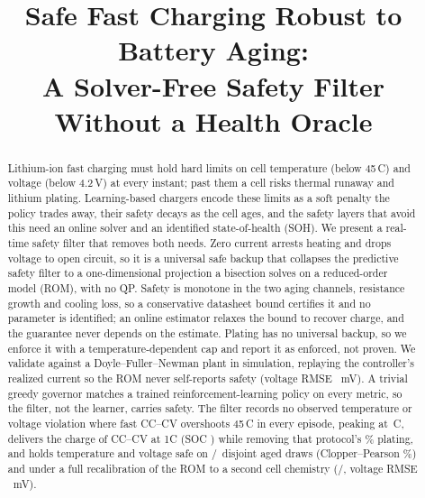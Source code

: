 \documentclass[conference]{IEEEtran}
\newcommand{\SI}[2]{#1\,#2}
\newcommand{\degreeCelsius}{\textdegree C}
\begin{document}
\title{Safe Fast Charging Robust to Battery Aging:\\
A Solver-Free Safety Filter Without a Health Oracle}

\author{
}

\maketitle

\begin{abstract}
Lithium-ion fast charging must hold hard limits on cell temperature (below \SI{45}{\degreeCelsius})
and voltage (below \SI{4.2}{V}) at every instant; past them a cell risks thermal runaway and lithium
plating. Learning-based chargers encode these limits as a soft penalty the policy trades away, their
safety decays as the cell ages, and the safety layers that avoid this need an online solver and an
identified state-of-health (SOH). We present a real-time safety filter that removes both needs. Zero
current arrests heating and drops voltage to open circuit, so it is a universal safe backup that
collapses the predictive safety filter to a one-dimensional projection a bisection solves on a
reduced-order model (ROM), with no QP. Safety is monotone in the two aging channels, resistance growth
and cooling loss, so a conservative datasheet bound certifies it and no parameter is identified; an
online estimator relaxes the bound to recover charge, and the guarantee never depends on the estimate.
Plating has no universal backup, so we enforce it with a temperature-dependent cap and report it as
enforced, not proven. We validate against a Doyle--Fuller--Newman plant in simulation, replaying the
controller's realized current so the ROM never self-reports safety (voltage RMSE \VRMSE~mV). A trivial
greedy governor matches a trained reinforcement-learning policy on every metric, so the filter, not
the learner, carries safety. The filter records no observed temperature or voltage violation where
fast CC--CV overshoots \SI{45}{\degreeCelsius} in every episode, peaking at
\SI{\dfnOursWarmT}{\degreeCelsius}, delivers the charge of CC--CV at 1C (SOC \oursWarmSoc)
while removing that protocol's \cconeWarmPviol\% plating, and holds temperature and voltage safe on
\valSafe/\valN\ disjoint aged draws (Clopper--Pearson \valCP\%) and under a full recalibration of the
ROM to a second cell chemistry (\chemTwoSafe/\chemTwoN, voltage RMSE \chemTwoV~mV).
\end{abstract}
\end{document}
